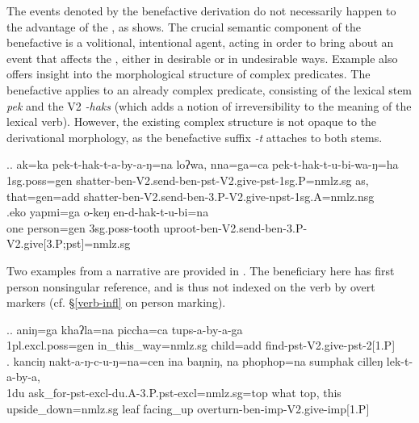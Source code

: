 The events denoted by the benefactive derivation do not necessarily happen to the advantage of the , as \Next shows. The crucial semantic component of the benefactive is a volitional, intentional agent, acting in order to bring about an event that affects the , either in desirable or in undesirable ways. Example \Next also offers insight into the morphological structure of complex predicates. The benefactive applies to an already complex predicate, consisting of the lexical stem \emph{pek}  and the V2 \emph{-haks}  (which adds a notion of irreversibility to the meaning of the lexical verb). However, the existing complex structure is not opaque to the derivational morphology, as the benefactive suffix \emph{-t} attaches to both stems.

\ex.\ag. ak=ka pek-t-hak-t-a-by-a-ŋ=na loʔwa, nna=ga=ca  pek-t-hak-t-u-bi-wa-ŋ=ha\\
{\sc 1sg.poss=gen} shatter-{\sc ben-V2.send-ben-pst-V2.give-pst-1sg.P=nmlz.sg} as,   that{\sc =gen=add} shatter-{\sc ben-V2.send-ben-3.P-V2.give-npst-1sg.A=nmlz.nsg}\\
 
\bg.eko yapmi=ga o-keŋ en-d-hak-t-u-bi=na\\
one person{\sc =gen} {\sc 3sg.poss-}tooth	uproot{\sc -ben-V2.send-ben-3.P-V2.give[3.P;pst]=nmlz.sg}\\
 

Two examples from a narrative are provided in \Next. The beneficiary here has first person nonsingular reference, and is thus not indexed on the verb by overt markers (cf. §\ref{verb-infl} on person marking).

\ex.\ag. aniŋ=ga          khaʔla=na   piccha=ca    tups-a-by-a-ga\\
	{\sc 1pl.excl.poss=gen} in\_this\_way{\sc =nmlz.sg} child{\sc =add} find{\sc -pst-V2.give-pst-2[1.P]}\\
 
\bg. kanciŋ nakt-a-ŋ-c-u-ŋ=na=cen ina baŋniŋ, na phophop=na sumphak cilleŋ  lek-t-a-by-a,\\
 {\sc 1du} ask\_for{\sc -pst-excl-du.A-3.P.pst-excl=nmlz.sg=top} what  {\sc top}, this upside\_down{\sc =nmlz.sg} leaf    facing\_up overturn{\sc -ben-imp-V2.give-imp[1.P]}\\


